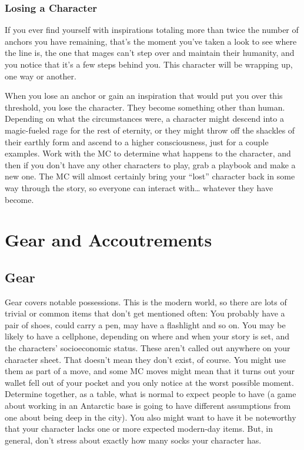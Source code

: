 \documentclass[
]{article}
\begin{document}
\hypertarget{losing-a-character}{%
\subsubsection{Losing a Character}\label{losing-a-character}}

If you ever find yourself with inspirations totaling more than twice the
number of anchors you have remaining, that's the moment you've taken a
look to see where the line is, the one that mages can't step over and
maintain their humanity, and you notice that it's a few steps behind
you. This character will be wrapping up, one way or another.

When you lose an anchor or gain an inspiration that would put you over
this threshold, you lose the character. They become something other than
human. Depending on what the circumstances were, a character might
descend into a magic-fueled rage for the rest of eternity, or they might
throw off the shackles of their earthly form and ascend to a higher
consciousness, just for a couple examples. Work with the MC to determine
what happens to the character, and then if you don't have any other
characters to play, grab a playbook and make a new one. The MC will
almost certainly bring your ``lost'' character back in some way through
the story, so everyone can interact with\ldots{} whatever they have
become.

\newpage

\label{Gear and Accoutrements chapter}

\hypertarget{gear-and-accoutrements-1}{%
\section{Gear and Accoutrements}\label{gear-and-accoutrements-1}}

\hypertarget{gear}{%
\subsection{Gear}\label{gear}}

Gear covers notable possessions. This is the modern world, so there are
lots of trivial or common items that don't get mentioned often: You
probably have a pair of shoes, could carry a pen, may have a flashlight
and so on. You may be likely to have a cellphone, depending on where and
when your story is set, and the characters' socioeconomic status. These
aren't called out anywhere on your character sheet. That doesn't mean
they don't exist, of course. You might use them as part of a move, and
some MC moves might mean that it turns out your wallet fell out of your
pocket and you only notice at the worst possible moment. Determine
together, as a table, what is normal to expect people to have (a game
about working in an Antarctic base is going to have different
assumptions from one about being deep in the city). You also might want
to have it be noteworthy that your character lacks one or more expected
modern-day items. But, in general, don't stress about exactly how many
socks your character has.
\end{document}

